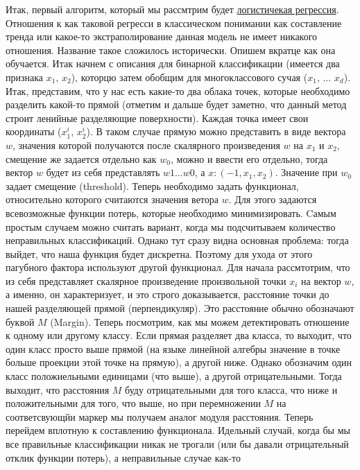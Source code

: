 \documentclass[11pt]{article}
\begin{document}
    Итак, первый алгоритм, который мы рассмтрим будет
\href{https://en.wikipedia.org/wiki/Logistic_regression}{логистичекая
регрессия}. Отношения к как таковой регресси в классическом понимании
как составление тренда или какое-то экстраполирование данная модель не
имеет никакого отношения. Название такое сложилось исторически. Опишем
вкратце как она обучается. Итак начнем с описания для бинарной
классификации (имеется два признака \(x_1\), \(x_2\)), которцю затем
обобщим для многоклассового сучая (\(x_1\), \(\dots\) \(x_d\)). Итак,
представим, что у нас есть какие-то два облака точек, которые необходимо
разделить какой-то прямой (отметим и дальше будет заметно, что данный
метод строит ленийные разделяющие поверхности). Каждая точка имеет свои
координаты (\(x_1^i\), \(x_2^i\)). В таком случае прямую можно
представить в виде вектора \(w\), значения которой получаются после
скалярного произведения \(w\) на \(x_1\) и \(x_2\), смещение же задается
отдельно как \(w_0\), можно и ввести его отдельно, тогда вектор \(w\)
будет из себя представлять \(w1\)...\(w0\), а \(x: (-1, x_1, x_2)\).
Значение при \(w_0\) задает смещение (threshold). Теперь необходимо
задать функционал, относительно которого считаются значения ветора
\(w\). Для этого задаются всевозможные функции потерь, которые
необходимо минимизировать. Cамым простым случаем можно считать вариант,
когда мы подсчитываем количество неправильных классификаций. Однако тут
сразу видна основная проблема: тогда выйдет, что наша функция будет
дискретна. Поэтому для ухода от этого пагубного фактора используют
другой функционал. Для начала рассмтотрим, что из себя представляет
скалярное произведение произвольной точки \(x_i\) на вектор \(w\), а
именно, он характеризует, и это строго доказывается, расстояние точки до
нашей разделяющей прямой (перпендикуляр). Это расстояние обычно
обозначают буквой \(M\) (Margin). Теперь посмотрим, как мы можем
детектировать отношение к одному или другому классу. Если прямая
разделяет два класса, то выходит, что один класс просто выше прямой (на
языке линейной алгебры значение в точке больше проекции этой точке на
прямую), а другой ниже. Однако обозначим один класс положиельными
единицами (что выше), а другой отрицательными. Тогда выходит, что
расстояния \(M\) буду отрицательными для того класса, что ниже и
положительными для того, что выше, но при перемножении \(M\) на
соответсвующйи маркер мы получаем аналог модуля расстояния. Теперь
перейдем вплотную к составлению функционала. Идельный случай, когда бы
мы все правильные классификации никак не трогали (или бы давали
отрицательный отклик функции потерь), а неправильные случае как-то
\end{document}
